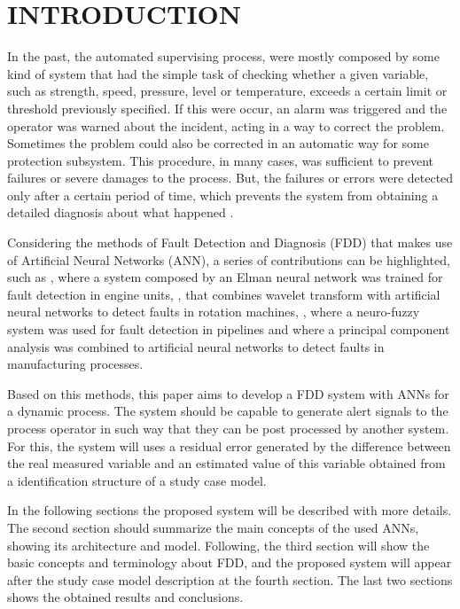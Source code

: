\documentclass[10pt,fleqn,a4paper]{article}
\begin{document}
\section{INTRODUCTION}
In the past, the automated supervising process, were mostly composed by some
kind of system that had the simple task of checking whether a given variable,
such as strength, speed, pressure, level or temperature, exceeds a certain limit
or threshold previously specified. If this were occur, an alarm was triggered
and the operator was warned about the incident, acting in a way to correct the
problem. Sometimes the problem could also be corrected in an automatic way for
some protection subsystem. This procedure, in many cases, was sufficient to
prevent failures or severe damages to the process. But, the failures or
errors were detected only after a certain period of time, which prevents the
system from obtaining a detailed diagnosis about what happened
\citep{isermann:2006}.

Considering the methods of Fault Detection and Diagnosis (FDD) that makes use of
Artificial Neural Networks (ANN), a series of contributions can be highlighted,
such as \citet{gao:2000}, where a system composed by an Elman neural network was
trained for fault detection in engine units, \citet{guo:2005}, that combines
wavelet transform with artificial neural networks to detect faults in rotation
machines,  \citet{tian:2007}, where a neuro-fuzzy system was used for fault
detection in pipelines and \citet{khaled:2010} where a principal component
analysis was combined to artificial neural networks to detect faults in
manufacturing processes.

Based on this methods, this paper aims to develop a FDD system with ANNs for a
dynamic process. The system should be capable to generate alert signals to the
process operator in such way that they can be post processed by another system.
For this, the system will uses a residual error generated by the difference
between the real measured variable and an estimated value of this variable
obtained from a identification structure of a study case model.

In the following sections the proposed system will be described with more
details. The second section should summarize the main concepts of the used ANNs,
showing its architecture and model. Following, the third section will show the
basic concepts and terminology about FDD, and the proposed system will appear
after the study case model description at the fourth section. The last two
sections shows the obtained results and conclusions.
\end{document}
